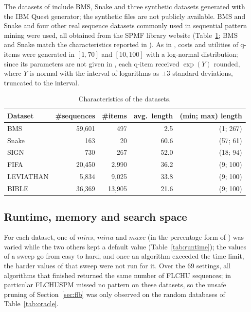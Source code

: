 \documentclass[pdflatex,sn-mathphys,Numbered]{sn-jnl}
\theoremstyle{thmstyleone}
\theoremstyle{thmstyletwo}
\theoremstyle{thmstylethree}
\newcommand{\FL}{\textsc{FLCHUSPM}}
\newcommand{\minu}{\ensuremath{\mathit{minu}}}
\newcommand{\maxc}{\ensuremath{\mathit{maxc}}}
\newcommand{\mins}{\ensuremath{\mathit{mins}}}
\begin{document}
The datasets of \cite{truong2022} include BMS, Snake and three synthetic datasets generated
with the IBM Quest generator; the synthetic files are not publicly available. BMS and Snake and
four other real sequence datasets commonly used in sequential pattern mining were used, all
obtained from the SPMF library website \cite{fournier2016spmf} (Table~\ref{tab:data}; BMS and
Snake match the characteristics reported in \cite{truong2022}). As in \cite{truong2022}, costs
and utilities of q-items were generated in $[1, 70]$ and $[10, 100]$ with a log-normal
distribution; since its parameters are not given in \cite{truong2022}, each q-item received $\exp(Y)$ rounded, where $Y$ is normal with the interval of logarithms as $\pm 3$
standard deviations, truncated to the interval.

\begin{table}[t]
\centering
\caption{Characteristics of the datasets.}
\label{tab:data}
\begin{tabular}{@{}lrrrr@{}}
\toprule
Dataset & \#sequences & \#items & avg.\ length & (min; max) length \\
\midrule
BMS & 59{,}601 & 497 & 2.5 & (1; 267) \\
Snake & 163 & 20 & 60.6 & (57; 61) \\
SIGN & 730 & 267 & 52.0 & (18; 94) \\
FIFA & 20{,}450 & 2{,}990 & 36.2 & (9; 100) \\
LEVIATHAN & 5{,}834 & 9{,}025 & 33.8 & (9; 100) \\
BIBLE & 36{,}369 & 13{,}905 & 21.6 & (9; 100) \\
\bottomrule
\end{tabular}
\end{table}

\subsection{Runtime, memory and search space}

For each dataset, one of \mins, \minu{} and \maxc{} (in the percentage form of
\cite{truong2022}) was varied while the two others kept a default value
(Table~\ref{tab:runtime}); the values of a sweep go from easy to hard, and once an algorithm
exceeded the time limit, the harder values of that sweep were not run for it. Over the 69
settings, all algorithms that finished returned the same number of FLCHU sequences; in
particular \FL{} missed no pattern on these datasets, so the unsafe pruning of
Section~\ref{sec:flb} was only observed on the random databases of Table~\ref{tab:oracle}.
\end{document}
